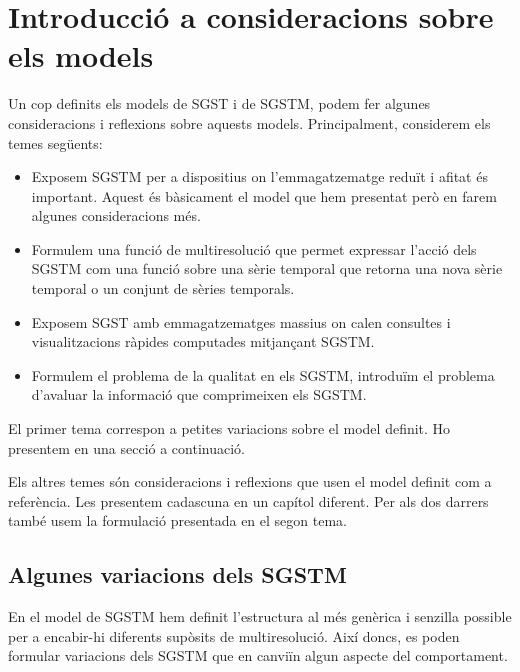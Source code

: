 \chapter{Introducció a consideracions sobre els models}

Un cop definits els models de \gls{SGST} i de \gls{SGSTM}, podem
fer algunes consideracions i reflexions sobre aquests models.
Principalment, considerem els temes següents:

\begin{itemize}
\item Exposem \gls{SGSTM} per a dispositius on l'emmagatzematge reduït
  i afitat és important. Aquest és bàsicament el model que hem
  presentat però en farem algunes consideracions més.

\item Formulem una funció de multiresolució que permet expressar
  l'acció dels \gls{SGSTM} com una funció sobre una sèrie temporal que
  retorna una nova sèrie temporal o un conjunt de sèries temporals.

\item Exposem \gls{SGST} amb emmagatzematges massius on calen
  consultes i visualitzacions ràpides computades mitjançant
  \gls{SGSTM}.

\item Formulem el problema de la qualitat en els \gls{SGSTM},
  introduïm el problema d'avaluar la informació que comprimeixen els
  \gls{SGSTM}.

\end{itemize}


El primer tema correspon a petites variacions sobre el model
definit. Ho presentem en una secció a continuació.

Els altres temes són consideracions i reflexions que usen el model
definit com a referència. Les presentem cadascuna en un capítol
diferent. Per als dos darrers també usem la formulació presentada en
el segon tema.






\section{Algunes variacions dels SGSTM}


En el model de \gls{SGSTM} hem definit l'estructura al més genèrica i
senzilla possible per a encabir-hi diferents supòsits de
multiresolució. Així doncs, es poden formular variacions dels
\gls{SGSTM} que en canviïn algun aspecte del comportament.


